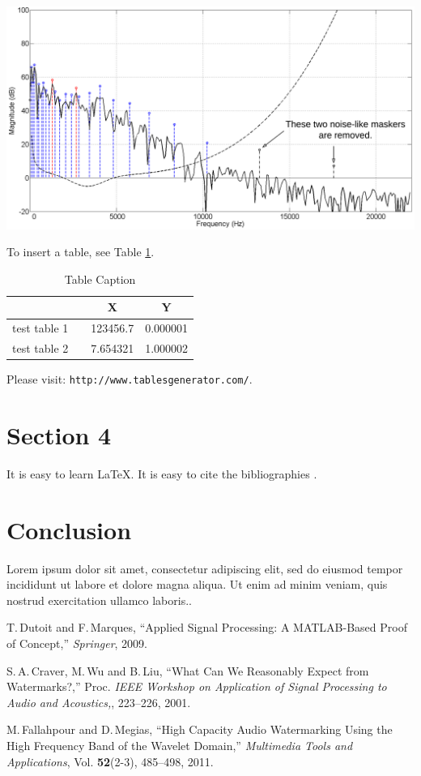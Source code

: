 \documentclass[conference,a4paper]{IEEEtran}
\begin{document}
\includegraphics[width=1\linewidth]{graph.png}

To insert a table, see Table \ref{table1}. 

\begin{table}[h]
\centering
\caption{Table Caption}
\label{table1}
\begin{tabular}{@{}llcc@{}}
\toprule
\multicolumn{1}{c}{\textbf{}} & \hspace{1cm} & \textbf{X} & \textbf{Y} \\ \midrule
test table 1 &  & 123456.7 & 0.000001 \\
test table 2 &  & 7.654321 & 1.000002 \\ \bottomrule
\end{tabular}
\end{table}

Please visit: \texttt{http://www.tablesgenerator.com/}.

\section{Section 4}

It is easy to learn \LaTeX. It is easy to cite the bibliographies \cite{dutoit2009}\cite{craver2001}\cite{fallahpour2011}.

\section{Conclusion}
Lorem ipsum dolor sit amet, consectetur adipiscing elit, sed do              
eiusmod tempor incididunt ut labore et dolore magna aliqua. Ut               
enim ad minim veniam, quis nostrud exercitation ullamco laboris..

\begin{thebibliography}{1}

T.\,Dutoit and F.\,Marques, ``Applied Signal Processing: A MATLAB-Based Proof of Concept,'' {\em{Springer}}, 2009.  

S.\,A.\,Craver, M.\,Wu and B.\,Liu, ``What Can We Reasonably Expect from Watermarks?,'' Proc. {\em{IEEE Workshop on Application of Signal Processing to Audio and Acoustics,}}, 223--226, 2001. 

M.\,Fallahpour and D.\,Megias, ``High Capacity Audio Watermarking Using the High Frequency Band of the Wavelet Domain,'' {\em{Multimedia Tools and Applications}}, Vol. \textbf{52}(2-3), 485--498, 2011.

\end{thebibliography}
\end{document}
